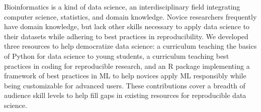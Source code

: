 Bioinformatics is a kind of data science, an interdisciplinary field integrating
computer science, statistics, and domain knowledge.
Novice researchers frequently have domain knowledge, but lack other skills
necessary to apply data science to their datasets while adhering to best
practices in reproducibility.
We developed three resources to help democratize data science:
a curriculum teaching the basics of Python for data science to young students,
a curriculum teaching best practices in coding for reproducible research,
and an R package implementing a framework of best practices in ML to help
novices apply ML responsibly while being customizable for advanced users.
These contributions cover a breadth of audience skill levels to help fill
gaps in existing resources for reproducible data science.
